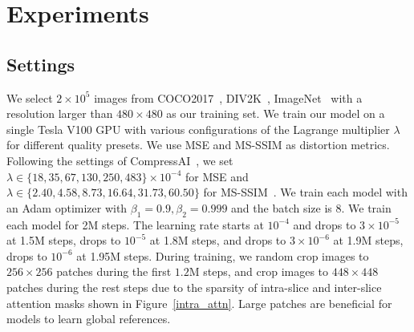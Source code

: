 \documentclass[sigconf]{acmart}
\begin{document}
\section{Experiments}\label{Sec:exp}
\subsection{Settings}
We select $2\times 10^5$ images from COCO2017~\cite{lin2014microsoft},
DIV2K~\cite{Agustsson_2017_CVPR_Workshops}, ImageNet~\cite{ILSVRC15}
with a resolution larger than $480\times 480$ as our training set.
We train our model on a single Tesla V100 GPU with various configurations
of the Lagrange multiplier $\lambda$ for different quality presets.
We use MSE and MS-SSIM as distortion metrics.
Following the settings of CompressAI~\cite{DBLP:journals/corr/abs-2011-03029},
we set $\lambda \in \{18, 35, 67, 130, 250, 483\} \times 10^{-4}$
for MSE and $\lambda \in \{2.40, 4.58, 8.73, 16.64, 31.73, 60.50\}$
for MS-SSIM~\cite{wang2003multiscale}.
We train each model with an Adam optimizer with $\beta_1=0.9, \beta_2=0.999$
and the batch size is 8. We train each model for 2M steps.
The learning rate starts at $10^{-4}$ and drops to $3\times 10^{-5}$ at 1.5M steps,
drops to $10^{-5}$ at 1.8M steps, and drops to $3 \times 10^{-6}$ at 1.9M steps,
drops to $10^{-6}$ at 1.95M steps.
During training, we random crop images to $256\times 256$ patches during the
first $1.2$M steps, and crop images to $448\times 448$ patches
during the rest steps due to the sparsity of intra-slice and
inter-slice attention masks shown in Figure~\ref{intra_attn}.
Large patches are beneficial for models to learn global references.
\end{document}
